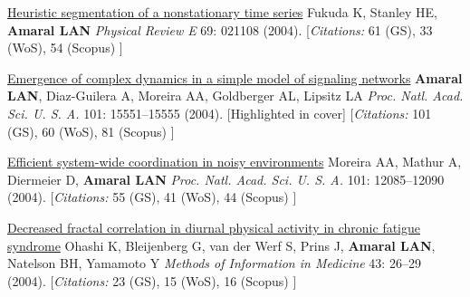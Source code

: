 \NumberedItem{\makebox[0.8cm][r]{[54]}}
\href{/people/amaral/heuristic-segmentation-of-a-nonstationary-time-series}
{Heuristic segmentation of a nonstationary time series}
\newline
Fukuda K, Stanley HE, {\textbf{Amaral LAN}}
\newline
\textit{Physical Review E}
    69:
021108 (2004).
    \newline
    \hfill [{\em{Citations:}} 61 (GS),
    33 (WoS), 54 (Scopus)
    ]
\newline
\Gap
~
\Gap

\NumberedItem{\makebox[0.8cm][r]{[53]}}
\href{/people/amaral/emergence-of-complex-dynamics-in-a-simple-model-of-signaling-networks}
{Emergence of complex dynamics in a simple model of signaling networks}
\newline
{\textbf{Amaral LAN}}, Diaz-Guilera A, Moreira AA, Goldberger AL, Lipsitz LA
\newline
\textit{Proc. Natl. Acad. Sci. U. S. A.}
    101:
15551--15555 (2004).
    [Highlighted in cover]
    \newline
    \hfill [{\em{Citations:}} 101 (GS),
    60 (WoS), 81 (Scopus)
    ]
\newline
\Gap
~
\Gap

\NumberedItem{\makebox[0.8cm][r]{[52]}}
\href{/people/amaral/efficient-system-wide-coordination-in-noisy-environments}
{Efficient system-wide coordination in noisy environments}
\newline
Moreira AA, Mathur A, Diermeier D, {\textbf{Amaral LAN}}
\newline
\textit{Proc. Natl. Acad. Sci. U. S. A.}
    101:
12085--12090 (2004).
    \newline
    \hfill [{\em{Citations:}} 55 (GS),
    41 (WoS), 44 (Scopus)
    ]
\newline
\Gap
~
\Gap

\NumberedItem{\makebox[0.8cm][r]{[51]}}
\href{/people/amaral/decreased-fractal-correlation-in-diurnal-physical-activity-in-chronic-fatigue-syndrome}
{Decreased fractal correlation in diurnal physical activity in chronic fatigue syndrome}
\newline
Ohashi K, Bleijenberg G, van der Werf S, Prins J, {\textbf{Amaral LAN}}, Natelson BH, Yamamoto Y
\newline
\textit{Methods of Information in Medicine }
    43:
26--29 (2004).
    \newline
    \hfill [{\em{Citations:}} 23 (GS),
    15 (WoS), 16 (Scopus)
    ]
\newline
\Gap
~
\Gap

